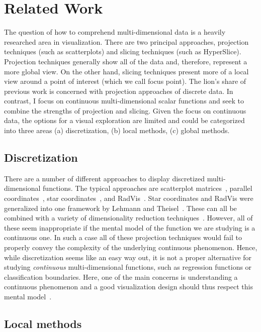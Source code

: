 \section{Related Work}\label{sec:background}

The question of how to comprehend multi-dimensional data is a heavily
researched area in visualization. There are two principal approaches,
projection techniques (such as scatterplots) and slicing techniques (such as
HyperSlice). Projection techniques generally show all of the data and,
therefore, represent a more global view. On the other hand, slicing techniques
present more of a local view around a point of interest (which we call focus
point). The lion's share of previous work is concerned with projection
approaches of discrete data. In contrast, I focus on continuous
multi-dimensional scalar functions and seek to combine the strengths of
projection and slicing. Given the focus on continuous data, the options for a
visual exploration are limited and could be categorized into three areas (a)
discretization, (b) local methods, (c) global methods.

\subsection{Discretization}

There are a number of different approaches to display discretized
multi-dimensional functions. The typical approaches are scatterplot
matrices~\cite{Hartigan:1975}, parallel coordinates~\cite{Inselberg:1985}, star
coordinates~\cite{Kandogan:2000}, and RadVis~\cite{Hoffman:1997}. 
Star coordinates and RadVis were generalized into one framework by Lehmann
and Theisel~\cite{Lehmann:2016a}.
These can all be combined with a variety of dimensionality
reduction techniques~\cite{Holbrey:2006}. However, all of these seem
inappropriate if the mental model of the function we are studying is a continuous
one. In such a case all of these projection techniques would fail to properly
convey the complexity of the underlying continuous phenomenon. Hence, while
discretization seems like an easy way out, it is not a proper alternative for
studying \emph{continuous} multi-dimensional functions, such as regression
functions or classification boundaries. Here, one of the main concerns is
understanding a continuous phenomenon and a good visualization design should
thus respect this mental model~\cite{Tory:2004a,Sedlmair:2012,Liu:2010a}.

\subsection{Local methods}

